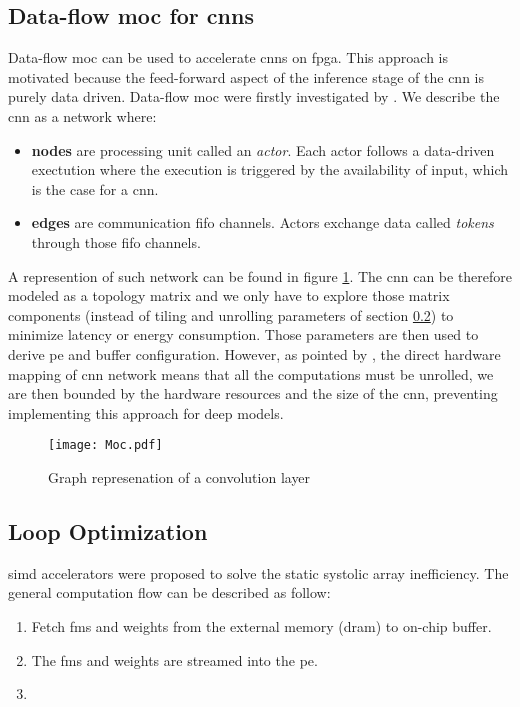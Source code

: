 \subsection{Data-flow \acrshort{moc} for \acrshort{cnn}s}
Data-flow \acrfull{moc} can be used to accelerate \acrshort{cnn}s on \acrshort{fpga}. This approach is motivated because the feed-forward aspect of the inference stage of the \acrshort{cnn} is purely data driven.
Data-flow \acrfull{moc} were firstly investigated by \cite{lin_li_low_2016}.  We describe the \acrshort{cnn} as a network where:
\begin{itemize}
    \item \textbf{nodes} are processing unit called an \textit{actor}. Each actor follows a data-driven exectution where the execution is triggered by the availability of input, which is the case for a \acrshort{cnn}.
    \item \textbf{edges} are communication \acrshort{fifo} channels. Actors exchange data called \textit{tokens} through those \acrshort{fifo} channels.
\end{itemize}
A represention of such network can be found in figure \ref{fig:moc}. \newline \newline
The \acrshort{cnn} can be therefore modeled as a topology matrix and we only have to explore those matrix components (instead of tiling and unrolling parameters of section \ref{subsec:loopopti}) to minimize latency or energy consumption. Those parameters are then used to derive \acrshort{pe} and buffer configuration. However, as pointed by \cite{abdelouahab_tactics_2017}, the direct hardware mapping of \acrshort{cnn} network means that all the computations must be unrolled, we are then bounded by the hardware resources and the size of the \acrshort{cnn}, preventing implementing this approach for deep models.
\begin{figure}
    \centering
    \texttt{[image: Moc.pdf]}
    \label{fig:moc}
    \caption{Graph represenation of a convolution layer}
\end{figure}
\subsection{Loop Optimization} \label{subsec:loopopti}
\acrfull{simd} accelerators were proposed to solve the static systolic array inefficiency. The general computation flow can be described as follow:
\begin{enumerate}
    \item Fetch \acrshort{fm}s and weights from the external memory (\acrshort{dram}) to on-chip buffer.
    \item The \acrshort{fm}s and weights are streamed into the \acrshort{pe}.
    \item 
\end{enumerate}
